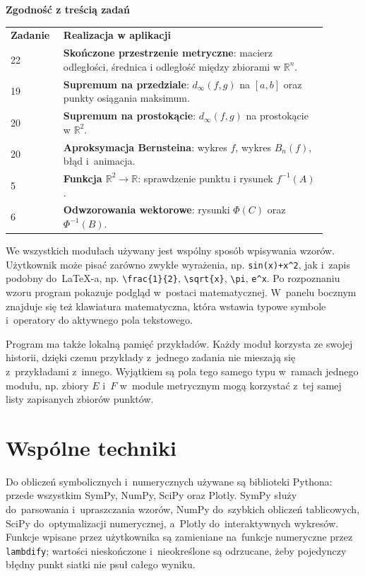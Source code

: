 \documentclass[12pt,a4paper]{article}
\newcommand{\plainnote}[2]{%
\par\medskip
\noindent\begin{minipage}{0.94\linewidth}
\textbf{#1}\par\smallskip
#2
\end{minipage}
\par\medskip
}
\newcommand{\methodbox}[2]{\plainnote{#1}{#2}}
\begin{document}
\methodbox{Zgodność z treścią zadań}{
\small
\begin{tabular}{p{0.13\linewidth}p{0.76\linewidth}}
\textbf{Zadanie} & \textbf{Realizacja w aplikacji} \\
22 & \textbf{Skończone przestrzenie metryczne}: macierz odległości, średnica i odległość między zbiorami w $\mathbb{R}^n$. \\
19 & \textbf{Supremum na przedziale}: $d_\infty(f,g)$ na $[a,b]$ oraz punkty osiągania maksimum. \\
20 & \textbf{Supremum na prostokącie}: $d_\infty(f,g)$ na prostokącie w $\mathbb{R}^2$. \\
20 & \textbf{Aproksymacja Bernsteina}: wykres $f$, wykres $B_n(f)$, błąd i~animacja. \\
5 & \textbf{Funkcja $\mathbb{R}^2\to\mathbb{R}$}: sprawdzenie punktu i rysunek $f^{-1}(A)$. \\
6 & \textbf{Odwzorowania wektorowe}: rysunki $\Phi(C)$ oraz $\Phi^{-1}(B)$. \\
\end{tabular}
}

We wszystkich modułach używany jest wspólny sposób wpisywania wzorów. Użytkownik może pisać zarówno zwykłe wyrażenia, np. \texttt{sin(x)+x\string^2}, jak i~zapis podobny do~LaTeX-a, np. \texttt{\textbackslash frac\{1\}\{2\}}, \texttt{\textbackslash sqrt\{x\}}, \texttt{\textbackslash pi}, \texttt{e\string^x}. Po rozpoznaniu wzoru program pokazuje podgląd w~postaci matematycznej. W~panelu bocznym znajduje się też klawiatura matematyczna, która wstawia typowe symbole i~operatory do aktywnego pola tekstowego.

Program ma także lokalną pamięć przykładów. Każdy moduł korzysta ze swojej historii, dzięki czemu przykłady z~jednego zadania nie mieszają się z~przykładami z~innego. Wyjątkiem są pola tego samego typu w~ramach jednego modułu, np. zbiory $E$ i~$F$ w~module metrycznym mogą korzystać z~tej samej listy zapisanych zbiorów punktów.

\section{Wspólne techniki}

Do obliczeń symbolicznych i~numerycznych używane są biblioteki Pythona: przede wszystkim SymPy, NumPy, SciPy oraz Plotly. SymPy służy do~parsowania i~upraszczania wzorów, NumPy do~szybkich obliczeń tablicowych, SciPy do~optymalizacji numerycznej, a~Plotly do~interaktywnych wykresów. Funkcje wpisane przez użytkownika są zamieniane na~funkcje numeryczne przez \texttt{lambdify}; wartości nieskończone i~nieokreślone są odrzucane, żeby pojedynczy błędny punkt siatki nie psuł całego wyniku.
\end{document}
